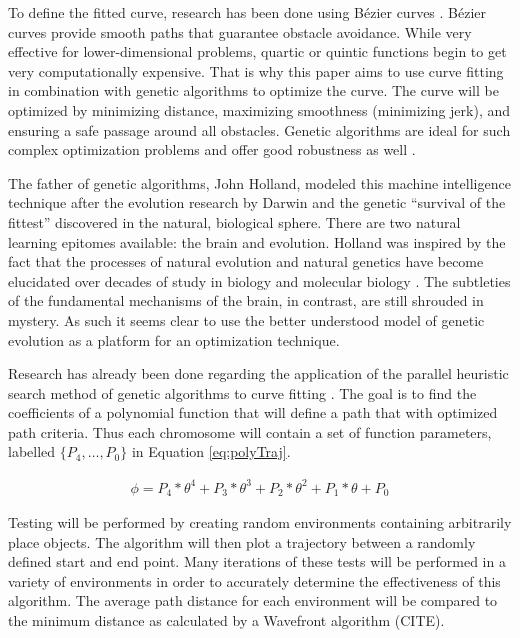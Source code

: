 To define the fitted curve, research has been done using B\'{e}zier curves \cite{choi10}. B\'{e}zier curves provide smooth paths that guarantee obstacle avoidance. While very effective for lower-dimensional problems, quartic or quintic functions begin to get very computationally expensive. That is why this paper aims to use curve fitting in combination with genetic algorithms to optimize the curve. The curve will be optimized by minimizing distance, maximizing smoothness (minimizing jerk), and ensuring a safe passage around all obstacles. Genetic algorithms are ideal for such complex optimization problems and offer good robustness as well \cite{zou12}.

The father of genetic algorithms, John Holland, modeled this machine intelligence technique after the evolution research by Darwin and the genetic ``survival of the fittest'' discovered in the natural, biological sphere. There are two natural learning epitomes available: the brain and evolution. Holland was inspired by the fact that the processes of natural evolution and natural genetics have become elucidated over decades of study in biology and molecular biology \cite{goldberg88}. The subtleties of the fundamental mechanisms of the brain, in contrast, are still shrouded in mystery. As such it seems clear to use the better understood model of genetic evolution as a platform for an optimization technique.

Research has already been done regarding the application of the parallel heuristic search method of genetic algorithms to curve fitting \cite{gulsen95,karr91,ismail08}. The goal is to find the coefficients of a polynomial function that will define a path that with optimized path criteria. Thus each chromosome will contain a set of function parameters, labelled $\{P_4, \ldots, P_0\}$ in Equation \ref{eq:polyTraj}.

\begin{align} \label{eq:polyTraj}
	\phi = P_4*\theta^4 + P_3*\theta^3 + P_2*\theta^2 + P_1*\theta + P_0
\end{align}

Testing will be performed by creating random environments containing arbitrarily place objects. The algorithm will then plot a trajectory between a randomly defined start and end point. Many iterations of these tests will be performed in a variety of environments in order to accurately determine the effectiveness of this algorithm. The average path distance for each environment will be compared to the minimum distance as calculated by a Wavefront algorithm (CITE).

